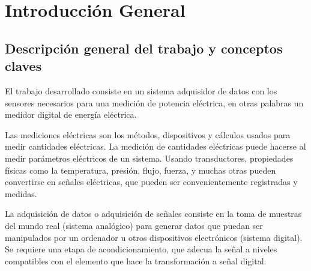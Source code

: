 
\chapter{Introducción General} %

\label{Chapter1} %
\label{IntroGeneral}


\newcommand{\keyword}[1]{\textbf{#1}}
\newcommand{\tabhead}[1]{\textbf{#1}}
\newcommand{\code}[1]{\texttt{#1}}
\newcommand{\file}[1]{\texttt{\bfseries#1}}
\newcommand{\option}[1]{\texttt{\itshape#1}}
\newcommand{\grados}{$^{\circ}$}



\section{Descripción general del trabajo y conceptos claves}

El trabajo desarrollado consiste en un sistema adquisidor de datos con los sensores necesarios para una medición de potencia eléctrica, en otras palabras un medidor digital de energía eléctrica.

Las mediciones eléctricas son los métodos, dispositivos y cálculos usados para medir cantidades eléctricas. La medición de cantidades eléctricas puede hacerse al medir parámetros eléctricos de un sistema. Usando transductores, propiedades físicas como la temperatura, presión, flujo, fuerza, y muchas otras pueden convertirse en señales eléctricas, que pueden ser convenientemente registradas y medidas. 


La adquisición de datos o adquisición de señales consiste en la toma de muestras del mundo real (sistema analógico) para generar datos que puedan ser manipulados por un ordenador u otros dispositivos electrónicos (sistema digital). Se requiere una etapa de acondicionamiento, que adecua la señal a niveles compatibles con el elemento que hace la transformación a señal digital.\cite{NIDataAdquisition}


